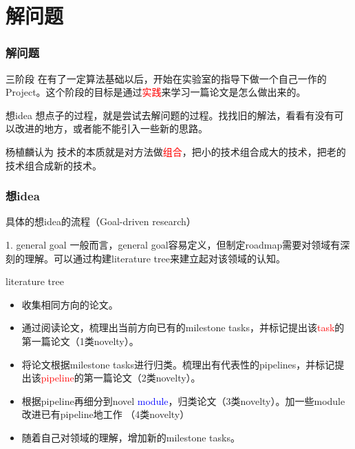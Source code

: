 \documentclass{beamer}
\begin{document}
\section{解问题}
\begin{frame}
    \frametitle{解问题}
    \begin{block}{三阶段}
        在有了一定算法基础以后，开始在实验室的指导下做一个自己一作的Project。这个阶段的目标是通过\textcolor{red}{实践}来学习一篇论文是怎么做出来的。
    \end{block}
    \begin{exampleblock}{想idea}
        想点子的过程，就是尝试去解问题的过程。找找旧的解法，看看有没有可以改进的地方，或者能不能引入一些新的思路。
    \end{exampleblock}
    \begin{block}{杨植麟认为}
        技术的本质就是对方法做\textcolor{red}{组合}，把小的技术组合成大的技术，把老的技术组合成新的技术。
    \end{block}
\end{frame}

\begin{frame}
    \frametitle{想idea}
    具体的想idea的流程（Goal-driven research）
    \begin{block}{1. general goal}
        一般而言，general goal容易定义，但制定roadmap需要对领域有深刻的理解。可以通过构建literature tree来建立起对该领域的认知。
    \end{block}
    \begin{block}{literature tree}
        \begin{itemize}
            \item 收集相同方向的论文。
            \item 通过阅读论文，梳理出当前方向已有的milestone tasks，并标记提出该\textcolor{red}{task}的第一篇论文（1类novelty）。
            \item 将论文根据milestone tasks进行归类。梳理出有代表性的pipelines，并标记提出该\textcolor{red}{pipeline}的第一篇论文（2类novelty）。
            \item 根据pipeline再细分到novel \textcolor{blue}{module}，归类论文（3类novelty）。加一些module改进已有pipeline地工作 （4类novelty）
            \item 随着自己对领域的理解，增加新的milestone tasks。
        \end{itemize}
    \end{block}
\end{frame}
\end{document}
